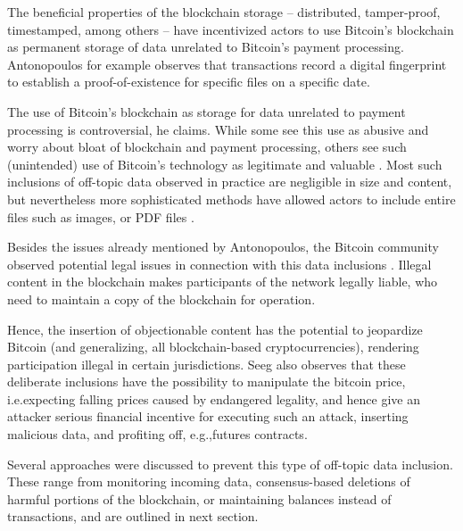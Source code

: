 \documentclass[a4paper,11pt,titlepage]{scrbook}
\begin{document}
The beneficial properties of the blockchain storage – distributed, tamper-proof, timestamped, among others – have incentivized actors to use Bitcoin's blockchain as permanent storage of data unrelated to Bitcoin's payment processing.
Antonopoulos for example observes that transactions record a digital fingerprint to establish a proof-of-existence for specific files on a specific date.

The use of Bitcoin's blockchain as storage for data unrelated to payment processing is controversial, he claims.
While some see this use as abusive and worry about bloat of blockchain and payment processing, others see such (unintended) use of Bitcoin's technology as legitimate and valuable \cite[155]{antonopoulos_mastering_2017}.
Most such inclusions of off-topic data observed in practice are negligible in size and content, but nevertheless more sophisticated methods have allowed actors to include entire files such as images, or PDF files \cite{matzutt_quantitative_2018}.

Besides the issues already mentioned by Antonopoulos, the Bitcoin community observed potential legal issues in connection with this data inclusions \cite{bitcoinwiki_weaknesses_2011}.
Illegal content in the blockchain makes participants of the network legally liable, who need to maintain a copy of the blockchain for operation.

Hence, the insertion of objectionable content has the potential to jeopardize Bitcoin (and generalizing, all blockchain-based cryptocurrencies), rendering participation illegal in certain jurisdictions.
Seeg \cite[1--2]{seeg_hardening_2018} also observes that these deliberate inclusions have the possibility to manipulate the bitcoin price, i.e.\@ expecting falling prices caused by endangered legality, and hence give an attacker serious financial incentive for executing such an attack, inserting malicious data, and profiting off, e.g.,\@ futures contracts.

Several approaches were discussed to prevent this type of off-topic data inclusion.
These range from monitoring incoming data, consensus-based deletions of harmful portions of the blockchain, or maintaining balances instead of transactions, and are outlined in next section.
\end{document}
